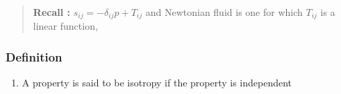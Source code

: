 \begin{quote}
	\textbf{Recall :}
$s_{ij} = -\delta_{ij} p + T_{ij}$ and Newtonian fluid is one for which $T_{ij}$ is a linear function,
\end{quote}

\subsubsection{Definition} %

\begin{enumerate}
	\item A property is said to be isotropy if the property is independent

\end{enumerate}





